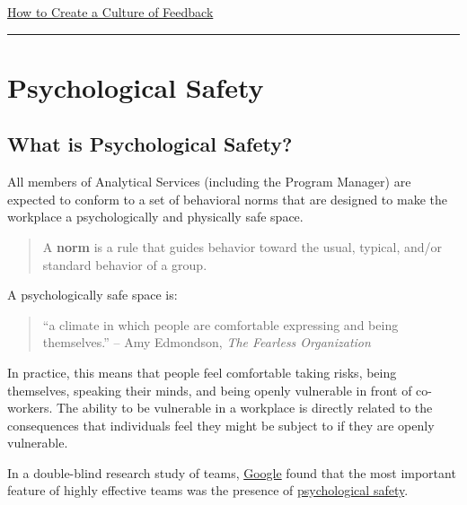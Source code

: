 \documentclass[
  letterpaper,
  DIV=11,
  numbers=noendperiod]{scrreprt}
\begin{document}
\href{https://www.youtube.com/watch?v=C0fRaM7M_WU}{How to Create a
Culture of Feedback}

\begin{center}\rule{0.5\linewidth}{0.5pt}\end{center}

\section{Psychological Safety}\label{psychological-safety}

\subsection{What is Psychological
Safety?}\label{what-is-psychological-safety}

All members of Analytical Services (including the Program Manager) are
expected to conform to a set of behavioral norms that are designed to
make the workplace a psychologically and physically safe space.

\begin{quote}
A \textbf{norm} is a rule that guides behavior toward the usual,
typical, and/or standard behavior of a group.
\end{quote}

A psychologically safe space is:

\begin{quote}
``a climate in which people are comfortable expressing and being
themselves.'' -- Amy Edmondson, \emph{The Fearless Organization}
\end{quote}

In practice, this means that people feel comfortable taking risks, being
themselves, speaking their minds, and being openly vulnerable in front
of co-workers. The ability to be vulnerable in a workplace is directly
related to the consequences that individuals feel they might be subject
to if they are openly vulnerable.

In a double-blind research study of teams,
\href{https://rework.withgoogle.com/guides/understanding-team-effectiveness/steps/introduction/}{Google}
found that the most important feature of highly effective teams was the
presence of
\href{https://rework.withgoogle.com/guides/understanding-team-effectiveness/steps/identify-dynamics-of-effective-teams/}{psychological
safety}.
\end{document}
